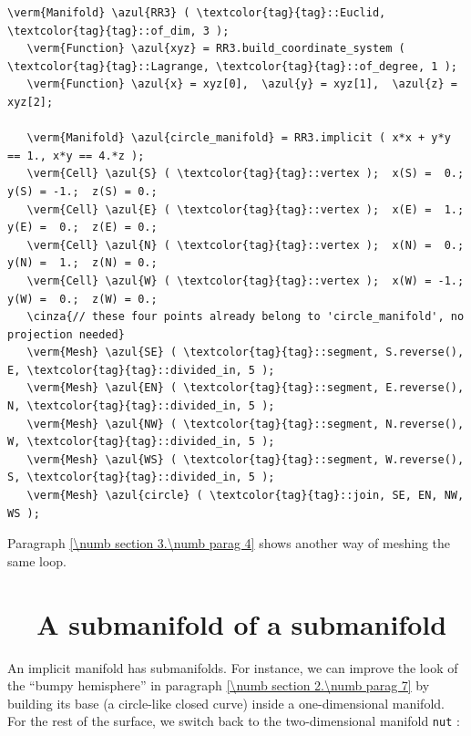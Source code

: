\begin{Verbatim}[commandchars=\\\{\},formatcom=\small\tt,frame=single,
   label=parag-\ref{\numb section 2.\numb parag 12}.cpp,rulecolor=\color{coment},
   baselinestretch=0.94,framesep=2mm]
   \verm{Manifold} \azul{RR3} ( \textcolor{tag}{tag}::Euclid, \textcolor{tag}{tag}::of_dim, 3 );
   \verm{Function} \azul{xyz} = RR3.build_coordinate_system ( \textcolor{tag}{tag}::Lagrange, \textcolor{tag}{tag}::of_degree, 1 );
   \verm{Function} \azul{x} = xyz[0],  \azul{y} = xyz[1],  \azul{z} = xyz[2];

   \verm{Manifold} \azul{circle_manifold} = RR3.implicit ( x*x + y*y == 1., x*y == 4.*z );
   \verm{Cell} \azul{S} ( \textcolor{tag}{tag}::vertex );  x(S) =  0.;   y(S) = -1.;  z(S) = 0.;
   \verm{Cell} \azul{E} ( \textcolor{tag}{tag}::vertex );  x(E) =  1.;   y(E) =  0.;  z(E) = 0.;
   \verm{Cell} \azul{N} ( \textcolor{tag}{tag}::vertex );  x(N) =  0.;   y(N) =  1.;  z(N) = 0.;
   \verm{Cell} \azul{W} ( \textcolor{tag}{tag}::vertex );  x(W) = -1.;   y(W) =  0.;  z(W) = 0.;
   \cinza{// these four points already belong to 'circle_manifold', no projection needed}
   \verm{Mesh} \azul{SE} ( \textcolor{tag}{tag}::segment, S.reverse(), E, \textcolor{tag}{tag}::divided_in, 5 );
   \verm{Mesh} \azul{EN} ( \textcolor{tag}{tag}::segment, E.reverse(), N, \textcolor{tag}{tag}::divided_in, 5 );
   \verm{Mesh} \azul{NW} ( \textcolor{tag}{tag}::segment, N.reverse(), W, \textcolor{tag}{tag}::divided_in, 5 );
   \verm{Mesh} \azul{WS} ( \textcolor{tag}{tag}::segment, W.reverse(), S, \textcolor{tag}{tag}::divided_in, 5 );
   \verm{Mesh} \azul{circle} ( \textcolor{tag}{tag}::join, SE, EN, NW, WS );
\end{Verbatim}

Paragraph \ref{\numb section 3.\numb parag 4} shows another way of meshing the same loop.


\section{~~A submanifold of a submanifold}\label{\numb section 2.\numb parag 13}

An implicit manifold has submanifolds.
For instance, we can improve the look of the ``bumpy hemisphere'' in paragraph
\ref{\numb section 2.\numb parag 7} by building its base (a circle-like closed curve)
inside a one-dimensional manifold.
For the rest of the surface, we switch back to the two-dimensional manifold {\small\tt nut} :
\medskip

